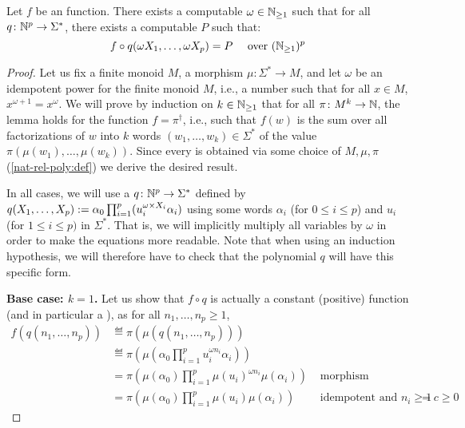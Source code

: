 \begin{lemma}
    \label{n-poly-combinatorics:lem}
    Let $f$ be an  function. 
    There exists a computable $\omega \in \mathbb{N}_{\geq 1}$
    such that for all 
    $q \colon \mathbb{N}^p \to \Sigma^*$,
    there exists a computable  $P$
    such that:
    \begin{equation*}
        f \circ q(\omega X_1, \dots, \omega X_p)
        =
        P
        \quad 
        \text{ over } (\mathbb{N}_{\geq 1})^p
    \end{equation*}
\end{lemma}
\begin{proof}
    Let us fix a finite monoid $M$, a morphism $\mu \colon \Sigma^* \to M$, and 
    let $\omega$ be an idempotent power for the finite monoid $M$,
    i.e., a number such that for all $x \in M$,
    $x^{\omega+1} = x^\omega$.
    We will prove by induction on $k \in \mathbb{N}_{\geq 1}$
    that for all
    $\pi \colon M^k \to \mathbb{N}$,
    the lemma holds for the function 
    $f = \pi^\dagger$, i.e., such that
    $f(w)$ is the sum over all factorizations of $w$
    into $k$ words $(w_1, \dots, w_k) \in \Sigma^*$
    of the value $\pi(\mu(w_1), \dots, \mu(w_k))$.
    Since every 
    is obtained via some choice of $M, \mu, \pi$ (\cref{nat-rel-poly:def})
    we derive the desired result.

    In all cases, we will use a  $q \colon \mathbb{N}^p \to
    \Sigma^*$ defined by $q(X_1, \dots, X_p) \mathrel{:=} \alpha_0 \prod_{i = 1}^p
    (u_i^{\omega \times X_i} \alpha_i)$ using some words $\alpha_i$ (for $0 \leq i
    \leq p$) and $u_i$ (for $1 \leq i \leq p)$ in $\Sigma^*$. That is, we will
    implicitly multiply all variables by $\omega$ in order to make the
    equations more readable. Note that when using an induction hypothesis, we
    will therefore have to check that the polynomial $q$ will have this
    specific form.

    \textbf{Base case: $k = 1$.}
    Let us show that $f \circ q$ is
    actually a constant (positive) function (and in particular a ), as for
    all $n_1, \dots, n_p \geq 1$,
    \begin{align*}
        f(q(n_1, \dots, n_p))
        &\eqdef \pi\left(\mu(q(n_1, \dots, n_p))\right) \\
        &\eqdef \pi\left(\mu(\alpha_0 \prod_{i = 1}^p u_i^{\omega n_i} \alpha_i)\right)
        \\
        &= \pi\left(\mu(\alpha_0) \prod_{i = 1}^p \mu(u_i)^{\omega n_i} \mu(\alpha_i)\right) 
        & \text{ morphism }
        \\
        &= \pi\left(\mu(\alpha_0) \prod_{i = 1}^p \mu(u_i) \mu(\alpha_i)\right)
        & \text{ idempotent and } n_i \geq 1
        &= c \geq 0
    \end{align*}


\end{proof}

